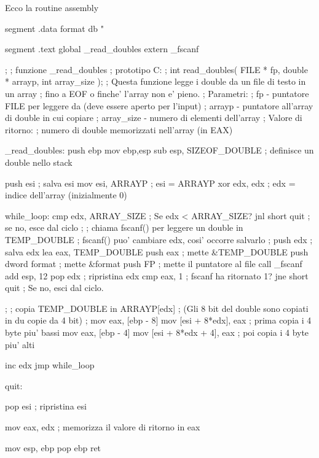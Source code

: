 Ecco la routine assembly
\begin{AsmCodeListing}[label=read.asm]
segment .data
format  db      "%

segment .text
        global  _read_doubles
        extern  _fscanf


;
; funzione _read_doubles
; prototipo C:
;   int read_doubles( FILE * fp, double * arrayp, int array_size );
; Questa funzione legge i double da un file di testo in un array 
; fino a EOF o finche' l'array non e' pieno.
; Parametri:
;   fp         - puntatore FILE per leggere da (deve essere aperto per l'input)
;   arrayp     - puntatore all'array di double in cui copiare
;   array_size - numero di elementi dell'array
; Valore di ritorno:
;   numero di double memorizzati nell'array (in EAX)

_read_doubles:
        push    ebp
        mov     ebp,esp
        sub     esp, SIZEOF_DOUBLE      ; definisce un double nello stack

        push    esi                     ; salva esi
        mov     esi, ARRAYP             ; esi = ARRAYP
        xor     edx, edx                ; edx = indice dell'array (inizialmente 0)

while_loop:
        cmp     edx, ARRAY_SIZE         ; Se edx < ARRAY_SIZE?
        jnl     short quit              ; se no, esce dal ciclo
;
; chiama fscanf() per leggere un double in TEMP_DOUBLE
; fscanf() puo' cambiare edx, cosi' occorre salvarlo
;
        push    edx                     ; salva edx
        lea     eax, TEMP_DOUBLE
        push    eax                     ; mette &TEMP_DOUBLE
        push    dword format            ; mette &format
        push    FP                      ; mette il puntatore al file
        call    _fscanf
        add     esp, 12
        pop     edx                     ; ripristina edx
        cmp     eax, 1                  ; fscanf ha ritornato 1?
        jne     short quit              ; Se no, esci dal ciclo.

;
; copia TEMP_DOUBLE in ARRAYP[edx]
; (Gli 8 bit del double sono copiati in du copie da 4 bit)
;
        mov     eax, [ebp - 8]
        mov     [esi + 8*edx], eax      ; prima copia i 4 byte piu' bassi
        mov     eax, [ebp - 4]
        mov     [esi + 8*edx + 4], eax  ; poi copia i 4 byte piu' alti

        inc     edx
        jmp     while_loop

quit:

        pop     esi                     ; ripristina esi

        mov     eax, edx                ; memorizza il valore di ritorno in eax

        mov     esp, ebp
        pop     ebp
        ret 
\end{AsmCodeListing}

